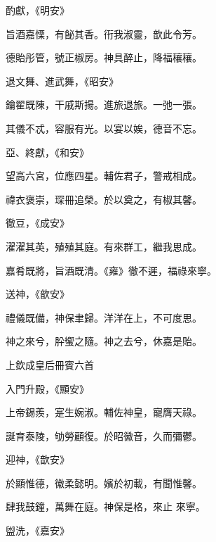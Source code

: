 \begin{pinyinscope}
 酌獻，《明安》



 旨酒嘉慄，有飶其香。衎我淑靈，歆此令芳。



 德貽彤管，號正椒房。神具醉止，降福穰穰。



 退文舞、進武舞，《昭安》



 鑰翟既陳，干戚斯揚。進旅退旅。一弛一張。



 其儀不忒，容服有光。以宴以娭，德音不忘。



 亞、終獻，《和安》



 望高六宮，位應四星。輔佐君子，警戒相成。



 禕衣褒崇，琛冊追榮。於以奠之，有椒其馨。



 徹豆，《成安》



 濯濯其英，殖殖其庭。有來群工，繼我思成。



 嘉肴既將，旨酒既清。《雍》徹不遲，福祿來寧。



 送神，《歆安》



 禮儀既備，神保聿歸。洋洋在上，不可度思。



 神之來兮，肸蠁之隨。神之去兮，休嘉是貽。



 上欽成皇后冊賓六首



 入門升殿，《顯安》



 上帝錫羨，寔生婉淑。輔佐神皇，寵膺天祿。



 誕育泰陵，劬勞顧復。於昭徽音，久而彌鬱。



 迎神，《歆安》



 於顯惟德，徽柔懿明。嬪於初載，有聞惟馨。



 肆我鼓鐘，萬舞在庭。神保是格，來止
 來寧。



 盥洗，《嘉安》




\end{pinyinscope}
